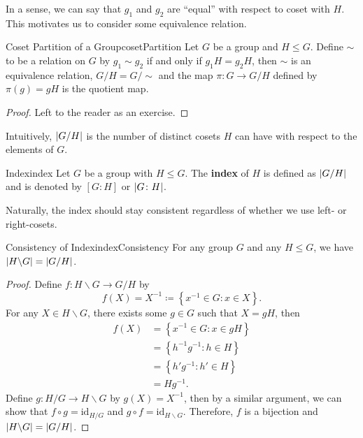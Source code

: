\documentclass[math]{amznotes}
\theoremstyle{remark}
\newcommand{\0}{\mathbf{0}}
\newcommand{\1}{\mathbf{1}}
\begin{document}
In a sense, we can say that $g_1$ and $g_2$ are ``equal'' with respect to coset with $H$. This motivates us to consider some equivalence relation.
\begin{probox}{Coset Partition of a Group}{cosetPartition}
    Let $G$ be a group and $H \leq G$. Define $\sim$ to be a relation on $G$ by $g_1 \sim g_2$ if and only if $g_1H = g_2H$, then $\sim$ is an equivalence relation, $G \slash H = G \slash \sim$ and the map $\pi \colon G \to G \slash H$ defined by $\pi\left(g\right) = gH$ is the quotient map.
    \tcblower
    \begin{proof}
        Left to the reader as an exercise.
    \end{proof}
\end{probox}
Intuitively, ${\left\lvert {G \slash H} \right\rvert}$ is the number of distinct cosets $H$ can have with respect to the elements of $G$.
\begin{dfnbox}{Index}{index}
    Let $G$ be a group with $H \leq G$. The {\color{red} \textbf{index}} of $H$ is defined as ${\left\lvert {G \slash H} \right\rvert}$ and is denoted by $\left[G : H\right]$ or ${\left\lvert {G \colon H} \right\rvert}$.
\end{dfnbox}
Naturally, the index should stay consistent regardless of whether we use left- or right-cosets.
\begin{probox}{Consistency of Index}{indexConsistency}
    For any group $G$ and any $H \leq G$, we have ${\left\lvert {H \backslash G} \right\rvert} = {\left\lvert {G \slash H} \right\rvert}$.
    \tcblower
    \begin{proof}
        Define $f \colon H \backslash G \to G \slash H$ by 
        \begin{equation*}
            f\left(X\right) = X^{-1} \coloneqq \left\{x^{-1} \in G \colon x \in X\right\}.
        \end{equation*}
        For any $X \in H \backslash G$, there exists some $g \in G$ such that $X = gH$, then 
        \begin{align*}
            f\left(X\right) & = \left\{x^{-1} \in G \colon x \in gH\right\} \\
            & = \left\{h^{-1}g^{-1} \colon h \in H\right\} \\
            & = \left\{h'g^{-1} \colon h' \in H\right\} \\
            & = Hg^{-1}.
        \end{align*}
        Define $g \colon H \slash G \to H \backslash G$ by $g\left(X\right) = X^{-1}$, then by a similar argument, we can show that $f \circ g = \mathrm{id}_{H \slash G}$ and $g \circ f = \mathrm{id}_{H \backslash G}$. Therefore, $f$ is a bijection and ${\left\lvert {H \backslash G} \right\rvert} = {\left\lvert {G \slash H} \right\rvert}$.
    \end{proof}
\end{probox}
\end{document}
